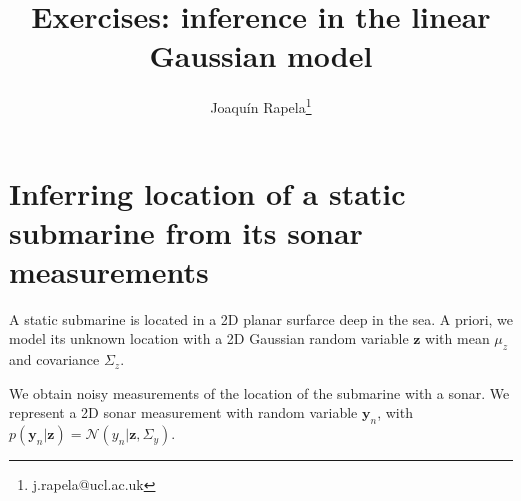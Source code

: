 \documentclass[12pt]{article}
\begin{document}
    \title{Exercises: inference in the linear Gaussian model}
    \author{Joaqu\'{i}n Rapela\thanks{j.rapela@ucl.ac.uk}}

    \maketitle

    \section{Inferring location of a static submarine from its sonar
    measurements}

    A static submarine is located in a 2D planar surfarce deep in the sea. A
    priori, we model its unknown location with a 2D Gaussian random variable
    $\mathbf{z}$ with mean $\mu_z$ and covariance $\Sigma_z$.

    We obtain noisy measurements of the location of the submarine with a sonar.
    We represent a 2D sonar measurement with random variable $\mathbf{y}_n$,
    with $p(\mathbf{y}_n|\mathbf{z})=\mathcal{N}(y_n|\mathbf{z}, \Sigma_y)$.
\end{document}
